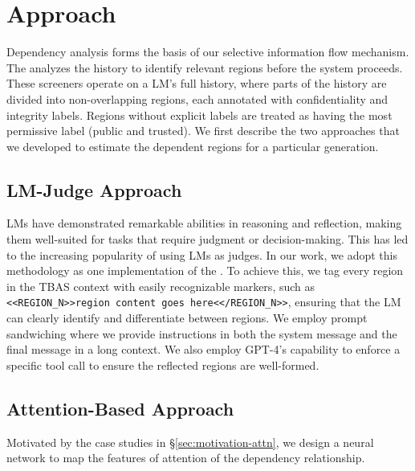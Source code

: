 \section{Approach}\label{approach_section}



Dependency analysis forms the basis of our selective information flow mechanism. The \textbf{\dependencydetector} analyzes the history to identify relevant regions before the system proceeds. These screeners operate on a LM’s full history, where parts of the history are divided into non-overlapping regions, each annotated with confidentiality and integrity labels. Regions without explicit labels are treated as having the most permissive label (public and trusted). We first describe the two approaches that we developed to estimate the dependent regions for a particular generation. 


\subsection{LM-Judge Approach}

LMs have demonstrated remarkable abilities in reasoning\cite{wei2023chainofthoughtpromptingelicitsreasoning, zelikman2024quietstarlanguagemodelsteach} and reflection\cite{renze2024selfreflectionllmagentseffects}, making them well-suited for tasks that require judgment or decision-making. This has led to the increasing popularity of using LMs as judges\cite{gu2025surveyllmasajudge}. In our work, we adopt this methodology as one implementation of the \dependencydetector. To achieve this, we tag every region in the TBAS context with easily recognizable markers, such as \texttt{<<REGION\_N>>region content goes here<</REGION\_N>>}, ensuring that the LM can clearly identify and differentiate between regions. We employ prompt sandwiching \cite{learning_prompt_sandwich_url} where we provide instructions in both the system message and the final message in a long context. We also employ GPT-4's capability to enforce a specific tool call to ensure the reflected regions are well-formed. 



\subsection{Attention-Based Approach}\label{sec:attn}

Motivated by the case studies in \S\ref{sec:motivation-attn}, we design a neural network to map the features of attention of the dependency relationship. 

